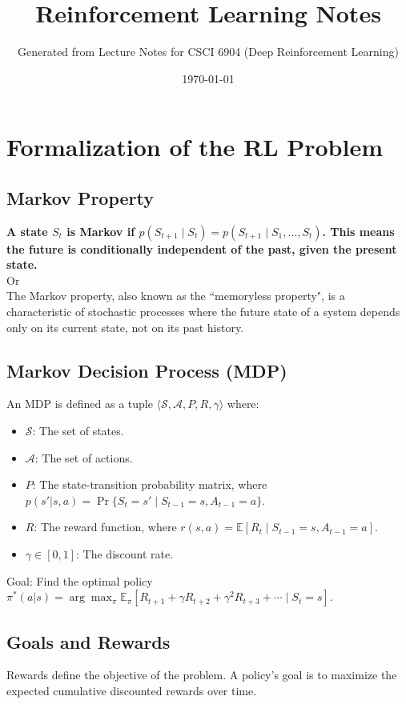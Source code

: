 \documentclass[12pt]{article}
\title{Reinforcement Learning Notes}
\author{Generated from Lecture Notes for CSCI 6904 (Deep Reinforcement Learning)}
\date{\today}
\begin{document}
\maketitle
\tableofcontents

\newpage

\section{Formalization of the RL Problem }


\subsection{Markov Property}
\textbf{A state $S_t$ is Markov if $p(S_{t+1} \mid S_t) = p(S_{t+1} \mid S_1, \dots, S_t)$. This means the future is conditionally independent of the past, given the present state.} \\
Or \\
The Markov property, also known as the ``memoryless property", is a characteristic of stochastic processes where the future state of a system depends only on its current state, not on its past history.

\subsection{Markov Decision Process (MDP)}
An MDP is defined as a tuple $\langle \mathcal{S}, \mathcal{A}, P, R, \gamma \rangle$ where:
\begin{itemize}
    \item $\mathcal{S}$: The set of states.
    \item $\mathcal{A}$: The set of actions.
    \item $P$: The state-transition probability matrix, where $p(s'|s,a) = \Pr\{S_t = s' \mid S_{t-1} = s, A_{t-1} = a\}$.
    \item $R$: The reward function, where $r(s,a) = \mathbb{E}[R_t \mid S_{t-1} = s, A_{t-1} = a]$.
    \item $\gamma \in [0,1]$: The discount rate.
\end{itemize}
Goal: Find the optimal policy $\pi^*(a|s) = \arg\max_\pi \mathbb{E}_\pi [R_{t+1} + \gamma R_{t+2} + \gamma^2 R_{t+3} + \cdots \mid S_t = s]$.


\subsection{Goals and Rewards}
Rewards define the objective of the problem. A policy's goal is to maximize the expected cumulative discounted rewards over time.
\end{document}
